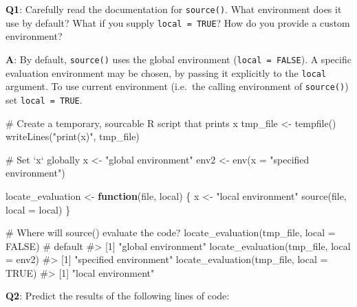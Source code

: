 \documentclass[
]{krantz}
\makeatletter
\newenvironment{Shaded}{\begin{snugshade}}{\end{snugshade}}
\newcommand{\CommentTok}[1]{\textcolor[rgb]{0.56,0.35,0.01}{\textit{#1}}}
\newcommand{\ControlFlowTok}[1]{\textcolor[rgb]{0.13,0.29,0.53}{\textbf{#1}}}
\newcommand{\DataTypeTok}[1]{\textcolor[rgb]{0.13,0.29,0.53}{#1}}
\newcommand{\KeywordTok}[1]{\textcolor[rgb]{0.13,0.29,0.53}{\textbf{#1}}}
\newcommand{\NormalTok}[1]{#1}
\newcommand{\OtherTok}[1]{\textcolor[rgb]{0.56,0.35,0.01}{#1}}
\newcommand{\StringTok}[1]{\textcolor[rgb]{0.31,0.60,0.02}{#1}}
\newenvironment{kframe}{%
\medskip{}
\setlength{\fboxsep}{.8em}
 \def\at@end@of@kframe{}%
 \ifinner\ifhmode%
  \def\at@end@of@kframe{\end{minipage}}%
  \begin{minipage}{\columnwidth}%
 \fi\fi%
 \def\FrameCommand##1{\hskip\@totalleftmargin \hskip-\fboxsep
 \colorbox{shadecolor}{##1}\hskip-\fboxsep
     \hskip-\linewidth \hskip-\@totalleftmargin \hskip\columnwidth}%
 \MakeFramed {\advance\hsize-\width
   \@totalleftmargin\z@ \linewidth\hsize
   \@setminipage}}%
 {\par\unskip\endMakeFramed%
 \at@end@of@kframe}
\renewenvironment{Shaded}{\begin{kframe}}{\end{kframe}}
\renewcommand{\KeywordTok} [1]{\textcolor[rgb]{0.00,0.44,0.13}{{#1}}}
\renewcommand{\DataTypeTok}[1]{\textcolor[rgb]{0.56,0.13,0.00}{{#1}}}
\renewcommand{\StringTok}  [1]{\textcolor[rgb]{0.25,0.44,0.63}{{#1}}}
\renewcommand{\CommentTok} [1]{\textcolor[rgb]{0.38,0.63,0.69}{{#1}}}
\renewcommand{\OtherTok}   [1]{\textcolor[rgb]{0.00,0.44,0.13}{{#1}}}
\renewcommand{\NormalTok}  [1]{{#1}}
\makeatother
\begin{document}
\textbf{{Q1}}: Carefully read the documentation for \texttt{source()}. What environment does it use by default? What if you supply \texttt{local\ =\ TRUE}? How do you provide a custom environment?

\textbf{{A}}: By default, \texttt{source()} uses the global environment (\texttt{local\ =\ FALSE}). A specific evaluation environment may be chosen, by passing it explicitly to the \texttt{local} argument. To use current environment (i.e.~the calling environment of \texttt{source()}) set \texttt{local\ =\ TRUE}.

\begin{Shaded}
\begin{Highlighting}[]
\CommentTok{# Create a temporary, sourcable R script that prints x}
\NormalTok{tmp_file <-}\StringTok{ }\KeywordTok{tempfile}\NormalTok{()}
\KeywordTok{writeLines}\NormalTok{(}\StringTok{"print(x)"}\NormalTok{, tmp_file)}

\CommentTok{# Set `x` globally}
\NormalTok{x <-}\StringTok{ "global environment"}
\NormalTok{env2 <-}\StringTok{ }\KeywordTok{env}\NormalTok{(}\DataTypeTok{x =} \StringTok{"specified environment"}\NormalTok{)}

\NormalTok{locate_evaluation <-}\StringTok{ }\ControlFlowTok{function}\NormalTok{(file, local) \{}
\NormalTok{  x <-}\StringTok{ "local environment"}
  \KeywordTok{source}\NormalTok{(file, }\DataTypeTok{local =}\NormalTok{ local)}
\NormalTok{\}}

\CommentTok{# Where will source() evaluate the code?}
\KeywordTok{locate_evaluation}\NormalTok{(tmp_file, }\DataTypeTok{local =} \OtherTok{FALSE}\NormalTok{)  }\CommentTok{# default}
\CommentTok{#> [1] "global environment"}
\KeywordTok{locate_evaluation}\NormalTok{(tmp_file, }\DataTypeTok{local =}\NormalTok{ env2)}
\CommentTok{#> [1] "specified environment"}
\KeywordTok{locate_evaluation}\NormalTok{(tmp_file, }\DataTypeTok{local =} \OtherTok{TRUE}\NormalTok{)}
\CommentTok{#> [1] "local environment"}
\end{Highlighting}
\end{Shaded}

\textbf{{Q2}}: Predict the results of the following lines of code:
\end{document}
